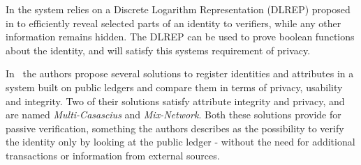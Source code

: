 In \cite{Augot2017} the system relies on a Discrete Logarithm Representation (DLREP) proposed in \cite{Brands2000} to efficiently reveal selected parts of an identity to verifiers, while any other information remains hidden. The DLREP can be used to prove boolean functions about the identity, and will satisfy this systems requirement of privacy. 

In~\cite{Azouvi2017} the authors propose several solutions to register identities and attributes in a system built on public ledgers and compare them in terms of privacy, usability and integrity. Two of their solutions satisfy attribute integrity and privacy, and are named \textit{Multi-Casascius} and \textit{Mix-Network}. Both these solutions provide for passive verification, something the authors describes as the possibility to verify the identity only by looking at the public ledger - without the need for additional transactions or information from external sources.
